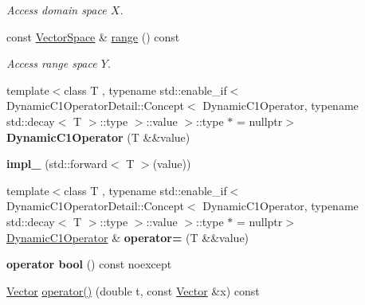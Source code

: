 \begin{DoxyCompactItemize}
\begin{DoxyCompactList}\small\item\em \-Access domain space $X$. \end{DoxyCompactList}\item 
\hypertarget{classSpacy_1_1DynamicC1Operator_a15daaabb27566457a0a3df02a13f9d96}{const \hyperlink{classSpacy_1_1VectorSpace}{\-Vector\-Space} \& \hyperlink{classSpacy_1_1DynamicC1Operator_a15daaabb27566457a0a3df02a13f9d96}{range} () const }\label{classSpacy_1_1DynamicC1Operator_a15daaabb27566457a0a3df02a13f9d96}

\begin{DoxyCompactList}\small\item\em \-Access range space $Y$. \end{DoxyCompactList}\item 
\hypertarget{classSpacy_1_1DynamicC1Operator_a9eeca088eb41c043b63c4b583f56d5ff}{{\footnotesize template$<$class T , typename std\-::enable\-\_\-if$<$ Dynamic\-C1\-Operator\-Detail\-::\-Concept$<$ Dynamic\-C1\-Operator, typename std\-::decay$<$ T $>$\-::type $>$\-::value $>$\-::type $\ast$  = nullptr$>$ }\\{\bfseries \-Dynamic\-C1\-Operator} (\-T \&\&value)}\label{classSpacy_1_1DynamicC1Operator_a9eeca088eb41c043b63c4b583f56d5ff}

\item 
\hypertarget{classSpacy_1_1DynamicC1Operator_a088f10c5b17d86962d7c6be8a9708597}{{\bfseries impl\-\_\-} (std\-::forward$<$ \-T $>$(value))}\label{classSpacy_1_1DynamicC1Operator_a088f10c5b17d86962d7c6be8a9708597}

\item 
\hypertarget{classSpacy_1_1DynamicC1Operator_a30da03500f47757230e26cd0eb5a684b}{{\footnotesize template$<$class T , typename std\-::enable\-\_\-if$<$ Dynamic\-C1\-Operator\-Detail\-::\-Concept$<$ Dynamic\-C1\-Operator, typename std\-::decay$<$ T $>$\-::type $>$\-::value $>$\-::type $\ast$  = nullptr$>$ }\\\hyperlink{classSpacy_1_1DynamicC1Operator}{\-Dynamic\-C1\-Operator} \& {\bfseries operator=} (\-T \&\&value)}\label{classSpacy_1_1DynamicC1Operator_a30da03500f47757230e26cd0eb5a684b}

\item 
\hypertarget{classSpacy_1_1DynamicC1Operator_a96e8e4291ea083b224d5e8efdab87ed7}{{\bfseries operator bool} () const noexcept}\label{classSpacy_1_1DynamicC1Operator_a96e8e4291ea083b224d5e8efdab87ed7}

\item 
\hypertarget{classSpacy_1_1DynamicC1Operator_a0859e4c204d9599769c42ca4147f1875}{\hyperlink{classSpacy_1_1Vector}{\-Vector} \hyperlink{classSpacy_1_1DynamicC1Operator_a0859e4c204d9599769c42ca4147f1875}{operator()} (double t, const \hyperlink{classSpacy_1_1Vector}{\-Vector} \&x) const }\label{classSpacy_1_1DynamicC1Operator_a0859e4c204d9599769c42ca4147f1875}


\end{DoxyCompactItemize}

